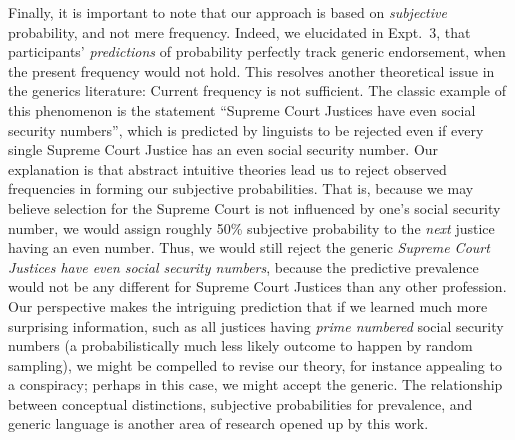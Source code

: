 \documentclass[12pt,letterpaper]{article}
\begin{document}
Finally, it is important to note that our approach is based on \emph{subjective} probability, and not mere frequency.
Indeed, we elucidated in Expt.~3, that participants' \emph{predictions} of probability perfectly track generic endorsement, when the present frequency would not hold.
This resolves another theoretical issue in the generics literature: Current frequency is not sufficient.%
The classic example of this phenomenon is the statement ``Supreme Court Justices have even social security numbers'', which is predicted by linguists to be rejected even if every single Supreme Court Justice has an even social security number.
Our explanation is that abstract intuitive theories lead us to reject observed frequencies in forming our subjective probabilities.
That is, because we may believe selection for the Supreme Court is not influenced by one's social security number, we would assign roughly 50\% subjective probability to the \emph{next} justice having an even number.
Thus, we would still reject the generic \emph{Supreme Court Justices have even social security numbers}, because the predictive prevalence would not be any different for Supreme Court Justices than any other profession. 
Our perspective makes the intriguing prediction that if we learned much more surprising information, such as all justices having \emph{prime numbered} social security numbers (a probabilistically much less likely outcome to happen by random sampling), we might be compelled to revise our theory, for instance appealing to a conspiracy; perhaps in this case, we might accept the generic.
The relationship between conceptual distinctions, subjective probabilities for prevalence, and generic language is another area of research opened up by this work. 




%
\end{document}
